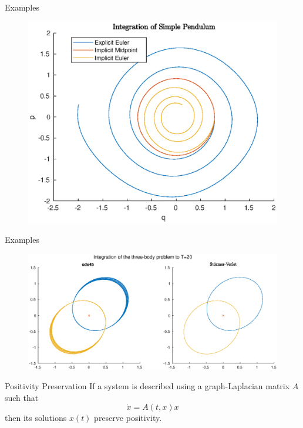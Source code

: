 \documentclass[aspectratio=169]{beamer}
\begin{document}
\begin{frame}{Examples}
	\begin{figure}
		\centering
		\includegraphics[height=0.7\textheight]{figures/pendulum.eps}
		\label{fig:pendulum}
	\end{figure}
\end{frame}

\begin{frame}{Examples}
	\begin{figure}
		\centering
		\includegraphics[width=\linewidth]{Matlab/threebodyorbit}
		\label{fig:threebody}
	\end{figure}
\end{frame}

\begin{frame}{Positivity Preservation}
	If a system is described using a graph-Laplacian matrix $A$ such that \pause
	\begin{equation*}
		\dot{x} = A(t,x)x
	\end{equation*} \pause
	then its solutions $x(t)$ preserve positivity.
\end{frame}
\end{document}
